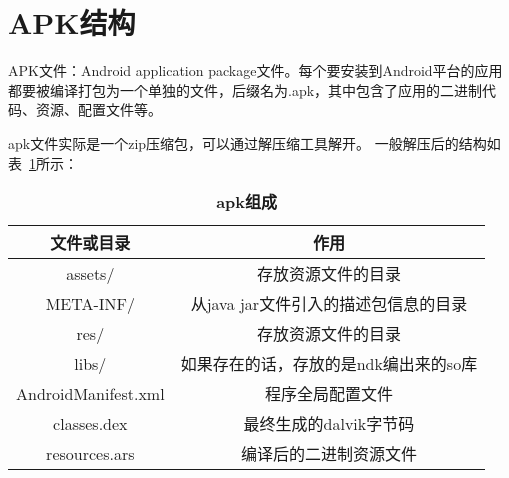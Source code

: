 \section{APK结构}
APK文件：Android application package文件。每个要安装到Android平台的应用都要被编译打包为一个单独的文件，后缀名为.apk，其中包含了应用的二进制代码、资源、配置文件等。

apk文件实际是一个zip压缩包，可以通过解压缩工具解开。
一般解压后的结构如表~\ref{tab:apk}所示：
\begin{table}[htbp]
\centering
\caption{\label{tab:apk}\textbf{apk组成}}
\begin{tabular}{|c|c|}
\hline
文件或目录 & 作用\\
\hline
assets/ & 存放资源文件的目录\\
\hline
META-INF/ & 从java jar文件引入的描述包信息的目录\\
\hline
res/ & 存放资源文件的目录\\
\hline
libs/ & 如果存在的话，存放的是ndk编出来的so库\\
\hline
AndroidManifest.xml & 程序全局配置文件\\
\hline
classes.dex & 最终生成的dalvik字节码\\
\hline
resources.ars & 编译后的二进制资源文件\\
\hline
\end{tabular}
\end{table}

